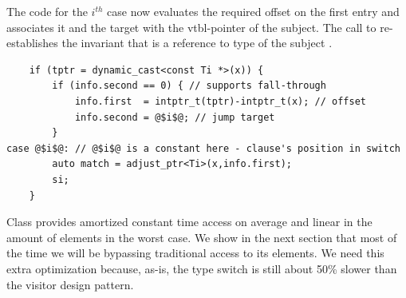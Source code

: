 \noindent
The code for the $i^{th}$ case now evaluates the required offset on the first 
entry and associates it and the target with the vtbl-pointer of the subject.
The call to  re-establishes the invariant that 
 is a reference to type  of the subject .

\begin{lstlisting}
    if (tptr = dynamic_cast<const Ti *>(x)) {
        if (info.second == 0) { // supports fall-through
            info.first  = intptr_t(tptr)-intptr_t(x); // offset
            info.second = @$i$@; // jump target
        }
case @$i$@: // @$i$@ is a constant here - clause's position in switch
        auto match = adjust_ptr<Ti>(x,info.first); 
        si;
    }
\end{lstlisting}

\noindent
%

Class  provides amortized constant time access on 
average and linear in the amount of elements in the worst case. We show in the 
next section that most of the time we will be bypassing traditional access to 
its elements. We need this extra optimization because, as-is, the type switch is 
still about 50\% slower than the visitor design pattern.


